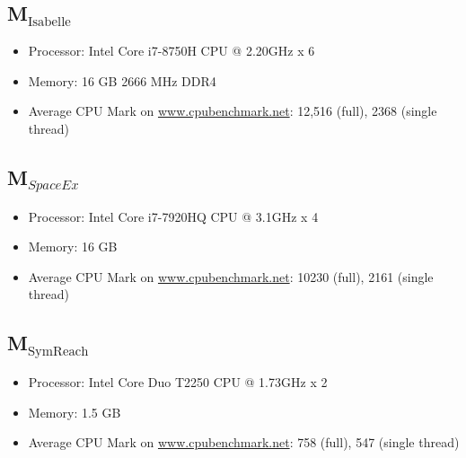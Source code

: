 \documentclass[EPiC]{easychair}
\begin{document}
\subsection{\texorpdfstring{M$_{\text{Isabelle}}$}{M-Isabelle}} \label{sec:machine:isabelle}
\begin{itemize}
 \item Processor: Intel Core i7-8750H CPU @ 2.20GHz x 6
 \item Memory: 16 GB 2666 MHz DDR4
 \item Average CPU Mark on \url{www.cpubenchmark.net}: 12,516 (full), 2368 (single thread)
\end{itemize}

\subsection{\texorpdfstring{M$_\mathit{SpaceEx}$}{M-SpaceEx}} \label{sec:machine:spaceex}
\begin{itemize}
	\item Processor: Intel Core i7-7920HQ CPU @ 3.1GHz x 4
    \item Memory: 16 GB
    \item Average CPU Mark on \url{www.cpubenchmark.net}: 10230 (full), 2161 (single thread)
\end{itemize}

\subsection{\texorpdfstring{M$_{\text{SymReach}}$}{M-SymReach}} \label{sec:machine:SymReach}
\begin{itemize}
 \item Processor: Intel Core Duo T2250 CPU @ 1.73GHz x 2
 \item Memory: 1.5 GB
 \item Average CPU Mark on \url{www.cpubenchmark.net}: 758 (full), 547 (single thread)
\end{itemize}



%
%
%

\end{document}
